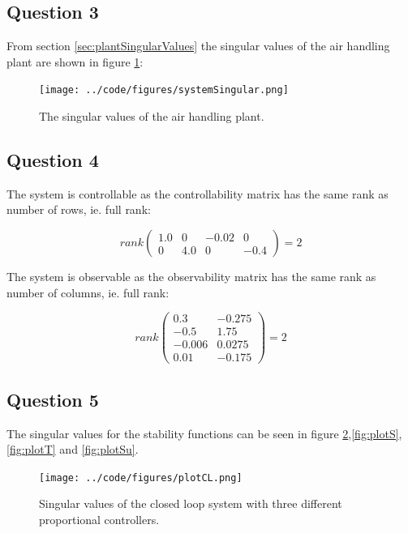\documentclass[a4paper, titlepage]{article}
\begin{document}
\subsection{Question 3}
From section \ref{sec:plantSingularValues} the singular values of the air handling plant are shown in figure \ref{fig:systemsingular}:


\begin{figure}[h!]
\center
\texttt{[image: ../code/figures/systemSingular.png]}
\caption{The singular values of the air handling plant.}
\label{fig:systemsingular}
\end{figure}


\subsection{Question 4}

The system is controllable as the controllability matrix has the same rank as number of rows, ie. full rank:

\begin{equation}
rank
\begin{pmatrix}
1.0 & 0 & -0.02 & 0 \\ 0 & 4.0 & 0 & -0.4
\end{pmatrix}
= 2
\label{equ:actual_contr}
\end{equation}


The system is observable as the observability matrix has the same rank as number of columns, ie. full rank:

\begin{equation}
rank
\begin{pmatrix}
0.3 & -0.275 \\ -0.5 & 1.75 \\ -0.006 & 0.0275 \\ 0.01 & -0.175
\end{pmatrix}
= 2
\label{equ:actual_observ}
\end{equation}


\subsection{Question 5}
The singular values for the stability functions can be seen in figure \ref{fig:plotCL},\ref{fig:plotS},\ref{fig:plotT} and \ref{fig:plotSu}.


\begin{figure}[H]
\center
\texttt{[image: ../code/figures/plotCL.png]}
\caption{Singular values of the closed loop system with three different proportional controllers.}
\label{fig:plotCL}
\end{figure}
\end{document}
